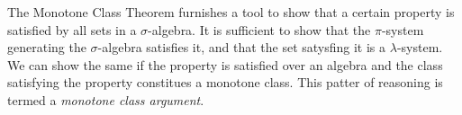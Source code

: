 \begin{my_remark}
	The Monotone Class Theorem furnishes a tool to show that a certain property is satisfied by all sets in a $\sigma$-algebra. It is sufficient to show that the $\pi$-system generating the $\sigma$-algebra satisfies it, and that the set satysfing it is a $\lambda$-system. We can show the same if the property is satisfied over an algebra and the class satisfying the property constitues a monotone class. This patter of reasoning is termed a \textit{monotone class argument}.
\end{my_remark}





